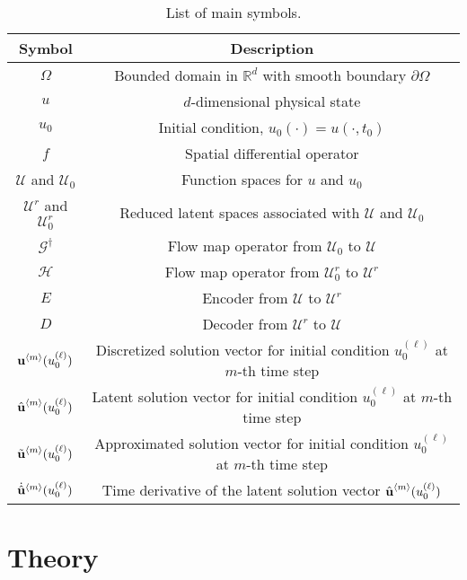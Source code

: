 \begin{table}[!ht]
    \caption[List of main symbols.]{List of main symbols.}
\label{tab:symbols}
\begin{center}
    \begin{tabular}{cc}
        \hline
        Symbol& Description\\\hline
        $\Omega$& Bounded domain in $\mathbb{R}^{d}$ with smooth boundary $\partial\Omega$\\
        $u$ & $d$-dimensional physical state \\
        $u_0$& Initial condition, $u_0(\cdot) = u(\cdot, t_0)$\\
        $f$& Spatial differential operator\\
        $\mathcal{U}$ and $\mathcal{U}_0$& Function spaces for $u$ and $u_0$\\
        $\mathcal{U}^r$ and $\mathcal{U}^r_0$& Reduced latent spaces associated with $\mathcal{U}$ and $\mathcal{U}_0$\\
        $\mathcal{G}^\dagger$& Flow map operator from $\mathcal{U}_0$ to $\mathcal{U}$\\
        $\mathcal{H}$& Flow map operator from $\mathcal{U}^r_0$ to $\mathcal{U}^r$\\
        $E$& Encoder from $\mathcal{U}$ to $\mathcal{U}^r$\\
        $D$& Decoder from $\mathcal{U}^r$ to $\mathcal{U}$\\
        $\textbf{u}^{\left<m\right>}(u_0^{(\ell)})$& Discretized solution vector for initial condition $u_0^{(\ell)}$ at $m$-th time step\\
        $\hat{\textbf{u}}^{\left<m\right>}(u_0^{(\ell)})$& Latent solution vector for initial condition $u_0^{(\ell)}$ at $m$-th time step\\
        $\tilde{\textbf{u}}^{\left<m\right>}(u_0^{(\ell)})$& Approximated solution vector for initial condition $u_0^{(\ell)}$ at $m$-th time step\\
        $\dot{\hat{\textbf{u}}}^{\left<m\right>}(u_0^{(\ell)})$& Time derivative of the latent solution vector $\hat{\textbf{u}}^{\left<m\right>}(u_0^{(\ell)})$\\
        \hline
    \end{tabular}
\end{center}
\end{table}

\section{Theory}
\label{sec:theory}

